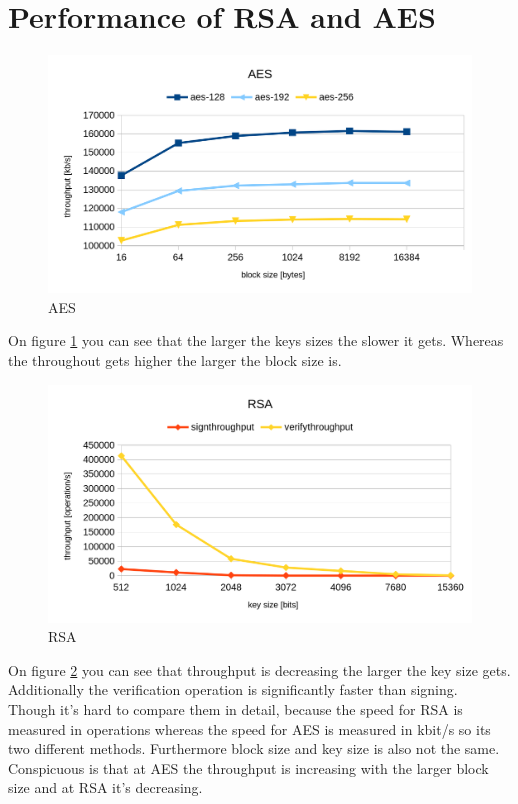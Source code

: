 \section{Performance of RSA and AES}

\begin{figure}[htp]
    \centering
    \caption{AES}
    \label{fig:aes}
    \includegraphics[width=\textwidth]{aes.png}
\end{figure}

On figure \ref{fig:aes} you can see that the larger the keys sizes the slower it gets. Whereas the throughout gets higher the larger the block size is.

\begin{figure}[htp]
    \centering
    \caption{RSA}
    \label{fig:rsa}
    \includegraphics[width=\textwidth]{rsa.png}
\end{figure}
On figure \ref{fig:rsa} you can see that throughput is decreasing the larger the key size gets. Additionally the verification operation is significantly faster than signing.\\
Though it's hard to compare them in detail, because the speed for RSA is measured in operations whereas the speed for AES is measured in kbit/s so its two different methods. Furthermore block size and key size is also not the same. Conspicuous is that at AES the throughput is increasing with the larger block size and at RSA it's decreasing.